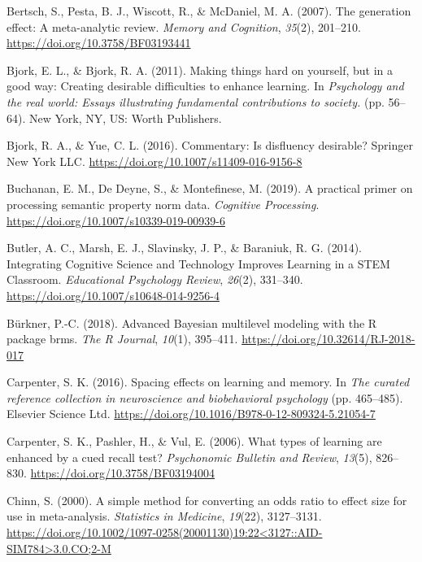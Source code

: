\documentclass[english,pdf]{apa6}
\begin{document}
\leavevmode\hypertarget{ref-Bertsch2007}{}%
Bertsch, S., Pesta, B. J., Wiscott, R., \& McDaniel, M. A. (2007). The generation effect: A meta-analytic review. \emph{Memory and Cognition}, \emph{35}(2), 201--210. \url{https://doi.org/10.3758/BF03193441}

\leavevmode\hypertarget{ref-Bjork2011}{}%
Bjork, E. L., \& Bjork, R. A. (2011). Making things hard on yourself, but in a good way: Creating desirable difficulties to enhance learning. In \emph{Psychology and the real world: Essays illustrating fundamental contributions to society.} (pp. 56--64). New York, NY, US: Worth Publishers.

\leavevmode\hypertarget{ref-Bjork2016}{}%
Bjork, R. A., \& Yue, C. L. (2016). Commentary: Is disfluency desirable? Springer New York LLC. \url{https://doi.org/10.1007/s11409-016-9156-8}

\leavevmode\hypertarget{ref-Buchanan2019}{}%
Buchanan, E. M., De Deyne, S., \& Montefinese, M. (2019). A practical primer on processing semantic property norm data. \emph{Cognitive Processing}. \url{https://doi.org/10.1007/s10339-019-00939-6}

\leavevmode\hypertarget{ref-Butler2014}{}%
Butler, A. C., Marsh, E. J., Slavinsky, J. P., \& Baraniuk, R. G. (2014). Integrating Cognitive Science and Technology Improves Learning in a STEM Classroom. \emph{Educational Psychology Review}, \emph{26}(2), 331--340. \url{https://doi.org/10.1007/s10648-014-9256-4}

\leavevmode\hypertarget{ref-Burkner2018}{}%
Bürkner, P.-C. (2018). Advanced Bayesian multilevel modeling with the R package brms. \emph{The R Journal}, \emph{10}(1), 395--411. \url{https://doi.org/10.32614/RJ-2018-017}

\leavevmode\hypertarget{ref-Carpenter2016}{}%
Carpenter, S. K. (2016). Spacing effects on learning and memory. In \emph{The curated reference collection in neuroscience and biobehavioral psychology} (pp. 465--485). Elsevier Science Ltd. \url{https://doi.org/10.1016/B978-0-12-809324-5.21054-7}

\leavevmode\hypertarget{ref-Carpenter2006}{}%
Carpenter, S. K., Pashler, H., \& Vul, E. (2006). What types of learning are enhanced by a cued recall test? \emph{Psychonomic Bulletin and Review}, \emph{13}(5), 826--830. \url{https://doi.org/10.3758/BF03194004}

\leavevmode\hypertarget{ref-Chinn2000}{}%
Chinn, S. (2000). A simple method for converting an odds ratio to effect size for use in meta-analysis. \emph{Statistics in Medicine}, \emph{19}(22), 3127--3131. \href{https://doi.org/10.1002/1097-0258(20001130)19:22\%3C3127::AID-SIM784\%3E3.0.CO;2-M}{https://doi.org/10.1002/1097-0258(20001130)19:22\textless{}3127::AID-SIM784\textgreater{}3.0.CO;2-M}
\end{document}
